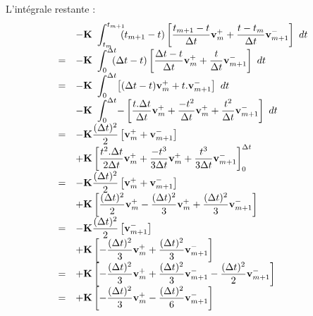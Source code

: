 \documentclass[12pt,a4paper]{report}
\begin{document}
L'intégrale restante :
\begin{equation}
\begin{array}{r l}
	  &\displaystyle	    
	    -\mathbf{K}~\int_{t_m}^{t_{m+1}} \!\!\! 	
		(t_{m+1}-t) \left[
			\frac{t_{m+1}-t}{\Delta t} \mathbf{v}_m^+ + 
			\frac{t-t_m}{\Delta t} \mathbf{v}_{m+1}^- 
			\right] ~dt
	\\
	=&\displaystyle	    
	    -\mathbf{K}~\int_{0}^{\Delta t} \!\!\! 	
		(\Delta t-t) \left[
			\frac{\Delta t-t}{\Delta t} \mathbf{v}_m^+ + 
			\frac{t}{\Delta t} \mathbf{v}_{m+1}^- 
			\right] ~dt
	\\
	=&\displaystyle	    
	    -\mathbf{K}~\int_{0}^{\Delta t} \!	
		\left[
			(\Delta t-t) \mathbf{v}_m^+ + 
			t. \mathbf{v}_{m+1}^- 
			\right]	~dt
		\\&\displaystyle
		-\mathbf{K}~\int_{0}^{\Delta t} \!
		- \left[
			\frac{t.\Delta t}{\Delta t} \mathbf{v}_m^+  
			+\frac{-t^2}{\Delta t} \mathbf{v}_m^+  
			+\frac{t^2}{\Delta t} \mathbf{v}_{m+1}^- 
		\right] 	
		~dt
	\\
	=&\displaystyle	    
	    -\mathbf{K} \frac{(\Delta t)^2}{2}
		  \left[
			\mathbf{v}_m^+ + \mathbf{v}_{m+1}^- 
		  \right]
		\\
		&\displaystyle
		+\mathbf{K}
		\left[
			\frac{t^2.\Delta t}{2 \Delta t} \mathbf{v}_m^+  
			+\frac{-t^3}{3 \Delta t} \mathbf{v}_m^+  
			+\frac{t^3}{3 \Delta t} \mathbf{v}_{m+1}^- 
		\right]_{0}^{\Delta t} 
	\\
	=&\displaystyle	    
	    -\mathbf{K} \frac{(\Delta t)^2}{2}
		  \left[
			\mathbf{v}_m^+ + \mathbf{v}_{m+1}^- 
		  \right]
		\\
		&\displaystyle	    
	    +\mathbf{K}
		\left[
			\frac{(\Delta t)^2}{2} \mathbf{v}_m^+  
			-\frac{(\Delta t)^2}{3} \mathbf{v}_m^+  
			+\frac{(\Delta t)^2}{3} \mathbf{v}_{m+1}^- 
		\right] 
	\\
	=&\displaystyle	    
	    -\mathbf{K} \frac{(\Delta t)^2}{2}
		  \left[
		    \mathbf{v}_{m+1}^- 
		  \right]
		\\
		&\displaystyle	    
	    +\mathbf{K}
		\left[ 
			-\frac{(\Delta t)^2}{3} \mathbf{v}_m^+  
			+\frac{(\Delta t)^2}{3} \mathbf{v}_{m+1}^- 
		\right]
	\\
	=&\displaystyle	    
	    +\mathbf{K}
		\left[ 
			-\frac{(\Delta t)^2}{3} \mathbf{v}_m^+  
			+\frac{(\Delta t)^2}{3} \mathbf{v}_{m+1}^-
			-\frac{(\Delta t)^2}{2} \mathbf{v}_{m+1}^- 
		\right]
	\\
	=&\displaystyle	    
	    +\mathbf{K}
		\left[ 
			-\frac{(\Delta t)^2}{3} \mathbf{v}_m^+  
			-\frac{(\Delta t)^2}{6} \mathbf{v}_{m+1}^-
		\right]
\end{array}
\end{equation}
\end{document}

